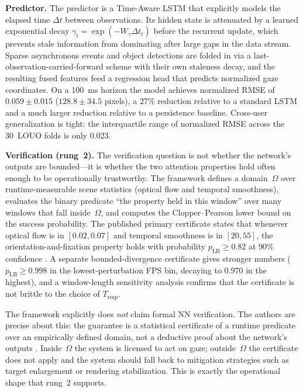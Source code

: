 \documentclass[graybox]{svmult}
\begin{document}
\textbf{Predictor.} The predictor is a Time-Aware LSTM \citep{baytas2017tlstm} that explicitly models the elapsed time $\Delta t$ between observations. Its hidden state is attenuated by a learned exponential decay $\gamma_t = \exp(-W_\gamma \Delta t_t)$ before the recurrent update, which prevents stale information from dominating after large gaps in the data stream. Sparse asynchronous events and object detections are folded in via a last-observation-carried-forward scheme with their own staleness decay, and the resulting fused features feed a regression head that predicts normalized gaze coordinates. On a 100~ms horizon the model achieves normalized RMSE of $0.059 \pm 0.015$ ($128.8 \pm 34.5$ pixels), a 27\% reduction relative to a standard LSTM and a much larger reduction relative to a persistence baseline. Cross-user generalization is tight: the interquartile range of normalized RMSE across the 30~LOUO folds is only 0.023.

\textbf{Verification (rung~2).} The verification question is not whether the network's outputs are bounded---it is whether the two attention properties hold often enough to be operationally trustworthy. The framework defines a domain~$\Omega$ over runtime-measurable scene statistics (optical flow and temporal smoothness), evaluates the binary predicate ``the property held in this window'' over many windows that fall inside~$\Omega$, and computes the Clopper--Pearson lower bound on the success probability. The published primary certificate states that whenever optical flow is in $[0.02, 0.07]$ and temporal smoothness is in $[20, 55]$, the orientation-and-fixation property holds with probability $p_{\text{LB}}\geq 0.82$ at 90\% confidence \citep{gaze2025reliability}. A separate bounded-divergence certificate gives stronger numbers ($p_{\text{LB}}\geq 0.998$ in the lowest-perturbation FPS bin, decaying to $0.970$ in the highest), and a window-length sensitivity analysis confirms that the certificate is not brittle to the choice of $T_{\text{resp}}$.

The framework explicitly does \emph{not} claim formal NN verification. The authors are precise about this: the guarantee is a statistical certificate of a runtime predicate over an empirically defined domain, not a deductive proof about the network's outputs \citep{gaze2025reliability}. Inside~$\Omega$ the system is licensed to act on gaze; outside~$\Omega$ the certificate does not apply and the system should fall back to mitigation strategies such as target enlargement or rendering stabilization. This is exactly the operational shape that rung~2 supports.
\end{document}

